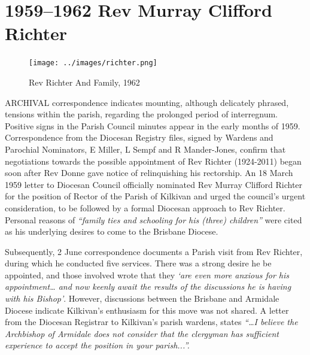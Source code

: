 \balance


\printendnotes[custom]
\setcounter{endnote}{0}
\chapter{1959--1962 Rev Murray Clifford Richter}
\nobalance








\begin{figure}
\begin{center}
\texttt{[image: ../images/richter.png]}
\caption{Rev Richter And Family, 1962}
\end{center}
\end{figure}




\lettrine[lines=3]{A}{RCHIVAL}
 correspondence indicates mounting, although delicately phrased, tensions within the parish, regarding the prolonged period of interregnum. Positive signs in the Parish Council minutes appear in the early months of 1959. Correspondence from the Diocesan Registry files, signed by Wardens and Parochial Nominators, E Miller, L Sempf and R Mander-Jones, confirm that negotiations towards the possible appointment of Rev Richter (1924-2011) began soon after Rev Donne gave notice of relinquishing his rectorship. An 18 March 1959 letter to Diocesan Council officially nominated Rev Murray Clifford Richter for the position of Rector of the Parish of Kilkivan and urged the council's urgent consideration, to be followed by a formal Diocesan approach to Rev Richter. Personal reasons of \emph{``family ties and schooling for his (three) children''} were cited as his underlying desires to come to the Brisbane Diocese.

Subsequently, 2 June correspondence documents a Parish visit from Rev Richter, during which he conducted five services. There was a strong desire he be appointed, and those involved wrote that they \emph{`are even more anxious for his appointment\ldots{} and now keenly await the results of the discussions he is having with his Bishop'}. However, discussions between the Brisbane and Armidale Diocese indicate Kilkivan's enthusiasm for this move was not shared. A letter from the Diocesan Registrar to Kilkivan's parish wardens, states \emph{``\ldots I believe the Archbishop of Armidale does not consider that the clergyman has sufficient experience to accept the position in your parish...''.}




